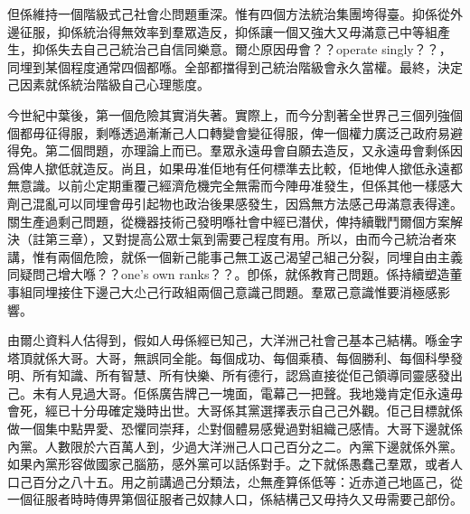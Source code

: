 但係維持一個階級式己社會尐問題重深。惟有四個方法統治集團垮得臺。抑係從外邊征服，抑係統治得無效率到羣眾造反，抑係讓一個又強大又毋滿意己中等組產生，抑係失去自己己統治己自信同樂意。爾尐原因毋會？？operate singly？？，同埋到某個程度通常四個都喺。全部都擋得到己統治階級會永久當權。最終，決定己因素就係統治階級自己心理態度。

今世紀中葉後，第一個危險其實消失著。實際上，而今分割著全世界己三個列強個個都毋征得服，剩喺透過漸漸己人口轉變會變征得服，俾一個權力廣泛己政府易避得免。第二個問題，亦理論上而已。羣眾永遠毋會自願去造反，又永遠毋會剩係因爲俾人撳低就造反。尚且，如果毋准佢地有任何標準去比較，佢地俾人撳低永遠都無意識。以前尐定期重覆己經濟危機完全無需而今陣毋准發生，但係其他一樣感大劑己混亂可以同埋會毋引起物也政治後果感發生，因爲無方法感己毋滿意表得達。關生產過剩己問題，從機器技術己發明喺社會中經已潛伏，俾持續戰鬥爾個方案解決（註第三章），又對提高公眾士氣到需要己程度有用。所以，由而今己統治者來講，惟有兩個危險，就係一個新己能事己無工返己渴望己組己分裂，同埋自由主義同疑問己增大喺？？one's own ranks？？。卽係，就係教育己問題。係持續塑造董事組同埋接住下邊己大尐己行政組兩個己意識己問題。羣眾己意識惟要消極感影響。

由爾尐資料人估得到，假如人毋係經已知己，大洋洲己社會己基本己結構。喺金字塔頂就係大哥。大哥，無誤同全能。每個成功、每個乘積、每個勝利、每個科學發明、所有知識、所有智慧、所有快樂、所有德行，認爲直接從佢己領導同靈感發出己。未有人見過大哥。佢係廣告牌己一塊面，電幕己一把聲。我地幾肯定佢永遠毋會死，經已十分毋確定幾時出世。大哥係其黨選擇表示自己己外觀。佢己目標就係做一個集中點畀愛、恐懼同崇拜，尐對個體易感覺過對組織己感情。大哥下邊就係內黨。人數限於六百萬人到，少過大洋洲己人口己百分之二。內黨下邊就係外黨。如果內黨形容做國家己腦筋，感外黨可以話係對手。之下就係愚蠢己羣眾，或者人口己百分之八十五。用之前講過己分類法，尐無產算係低等：近赤道己地區己，從一個征服者時時傳畀第個征服者己奴隸人口，係結構己又毋持久又毋需要己部份。


